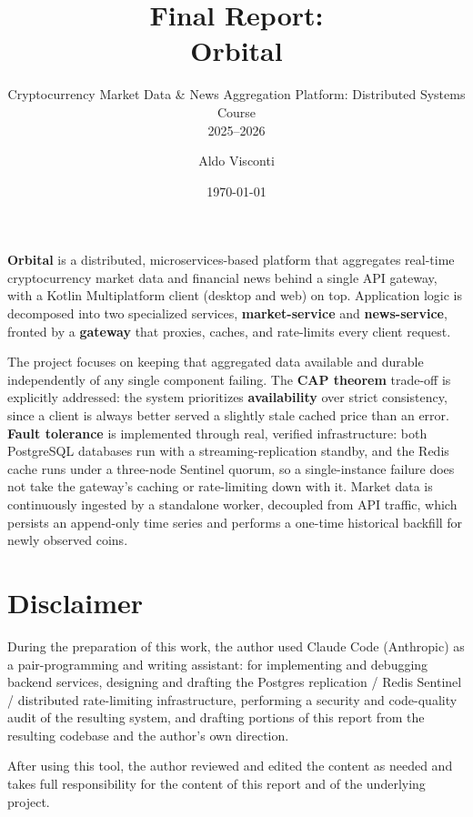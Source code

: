 \documentclass{scrartcl}
\title{\LARGE
    Final Report:\\
    Orbital
}
\subtitle{Cryptocurrency Market Data \& News Aggregation Platform: Distributed Systems Course\\
2025--2026}
\author{
    Aldo Visconti \\ \emailaddr{aldo.visconti@studio.unibo.it}
}
\date{\today}
\begin{document}
\sloppy

\maketitle

\noindent
\textbf{Orbital} is a distributed, microservices-based platform that aggregates real-time
cryptocurrency market data and financial news behind a single API gateway, with a Kotlin
Multiplatform client (desktop and web) on top. Application logic is decomposed into two
specialized services, \textbf{market-service} and \textbf{news-service}, fronted by a
\textbf{gateway} that proxies, caches, and rate-limits every client request.

The project focuses on keeping that aggregated data available and durable independently of any
single component failing. The \textbf{CAP theorem} trade-off is explicitly addressed: the system
prioritizes \textbf{availability} over strict consistency, since a client is always better served
a slightly stale cached price than an error. \textbf{Fault tolerance} is implemented through
real, verified infrastructure: both PostgreSQL databases run with a streaming-replication
standby, and the Redis cache runs under a three-node Sentinel quorum, so a single-instance
failure does not take the gateway's caching or rate-limiting down with it. Market data is
continuously ingested by a standalone worker, decoupled from API traffic, which persists an
append-only time series and performs a one-time historical backfill for newly observed coins.

\section*{Disclaimer}

During the preparation of this work, the author used Claude Code (Anthropic) as a pair-programming
and writing assistant: for implementing and debugging backend services, designing and drafting the
Postgres replication / Redis Sentinel / distributed rate-limiting infrastructure, performing a
security and code-quality audit of the resulting system, and drafting portions of this report from
the resulting codebase and the author's own direction.

After using this tool, the author reviewed and edited the content as needed and takes full
responsibility for the content of this report and of the underlying project.
\end{document}
